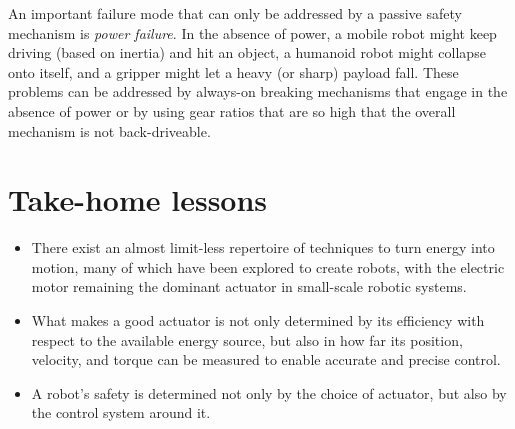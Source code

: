 An important failure mode that can only be addressed by a passive safety mechanism is \textsl{power failure}. In the absence of power, a mobile robot might keep driving (based on inertia) and hit an object, a humanoid robot might collapse onto itself, and a gripper might let a heavy (or sharp) payload fall. These problems can be addressed by always-on breaking mechanisms that engage in the absence of power or by using gear ratios that are so high that the overall mechanism is not back-driveable.

\section*{Take-home lessons}
\begin{itemize}
\item There exist an almost limit-less repertoire of techniques to turn energy into motion, many of which have been explored to create robots, with the electric motor remaining the dominant actuator in small-scale robotic systems.
\item What makes a good actuator is not only determined by its efficiency with respect to the available energy source, but also in how far its position, velocity, and torque can be measured to enable accurate and precise control.
\item A robot's safety is determined not only by the choice of actuator, but also by the control system around it.
\end{itemize}



